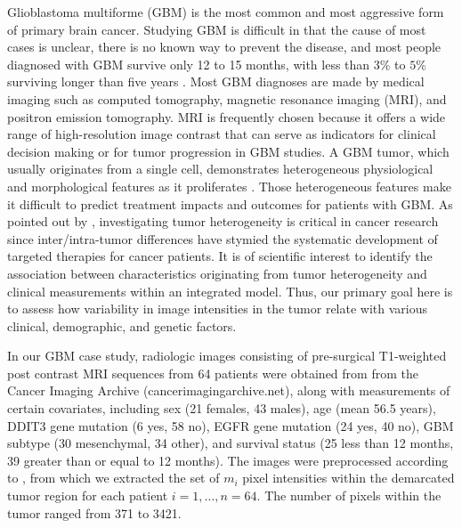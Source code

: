\documentclass[11pt]{article}
\begin{document}
Glioblastoma multiforme (GBM) is the most common and most aggressive form of primary brain cancer.  Studying GBM is difficult in that  the cause of most cases is unclear, there is no known way to prevent the disease, and most people diagnosed with GBM survive only  12 to 15 months, with less than $3\%$ to $5\%$ surviving longer than five years \cite{tutt2011glioblastoma}. Most GBM diagnoses are made by medical imaging such as  computed tomography, magnetic resonance imaging (MRI), and positron emission tomography. MRI is frequently chosen because it offers a wide range of high-resolution image contrast that can   serve as indicators for clinical decision making or for tumor progression in GBM studies. 
A GBM tumor, which usually originates from a single cell,  demonstrates heterogeneous physiological and morphological features  as it proliferates \cite{marusyk2012intra}.  Those heterogeneous features make it difficult to predict treatment impacts and outcomes for patients with GBM.  As pointed out by \cite{felipe2013cancer}, investigating tumor heterogeneity is critical in cancer research since inter/intra-tumor differences have stymied the systematic development of targeted therapies for cancer patients. It is of scientific interest to identify the association between characteristics originating from tumor heterogeneity and  clinical measurements within an integrated model.  Thus, our primary goal here is to assess how variability in image intensities in the tumor relate with various clinical, demographic, and genetic factors.   %

In our GBM case study, radiologic images consisting of pre-surgical T1-weighted post contrast MRI sequences from 64 patients were obtained from from the Cancer Imaging Archive (cancerimagingarchive.net), along with measurements of certain covariates, including sex (21 females, 43 males), age (mean 56.5 years), DDIT3 gene mutation (6 yes, 58 no), EGFR gene mutation (24 yes, 40 no), GBM subtype (30 mesenchymal, 34 other), and survival status (25 less than 12 months, 39 greater than or equal to 12 months).  The images were preprocessed according to \cite{saha2016demarcate}, from which we extracted the set of $m_i$ pixel intensities within the demarcated tumor region for each patient $i=1,\ldots,n=64$.  The number of pixels within the tumor ranged from 371 to 3421.  
\end{document}
